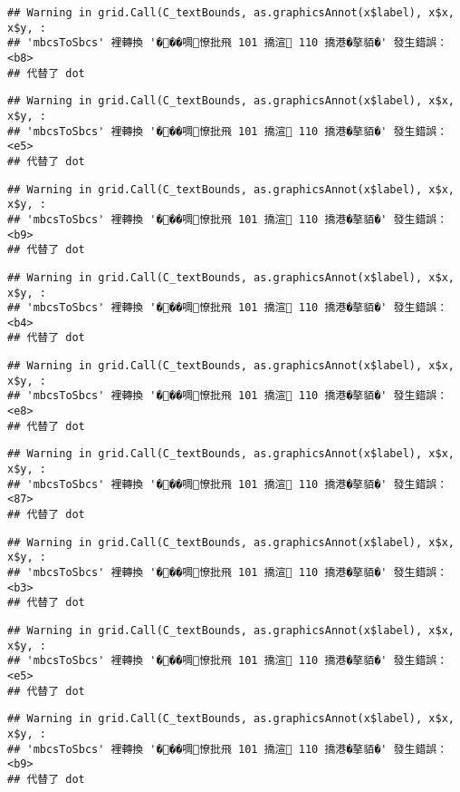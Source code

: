 \documentclass[
]{article}
\begin{document}
\begin{verbatim}
## Warning in grid.Call(C_textBounds, as.graphicsAnnot(x$label), x$x, x$y, :
## 'mbcsToSbcs' 裡轉換 '���啁憭批飛 101 撟渲 110 撟港�摮貊�' 發生錯誤：<b8>
## 代替了 dot
\end{verbatim}

\begin{verbatim}
## Warning in grid.Call(C_textBounds, as.graphicsAnnot(x$label), x$x, x$y, :
## 'mbcsToSbcs' 裡轉換 '���啁憭批飛 101 撟渲 110 撟港�摮貊�' 發生錯誤：<e5>
## 代替了 dot
\end{verbatim}

\begin{verbatim}
## Warning in grid.Call(C_textBounds, as.graphicsAnnot(x$label), x$x, x$y, :
## 'mbcsToSbcs' 裡轉換 '���啁憭批飛 101 撟渲 110 撟港�摮貊�' 發生錯誤：<b9>
## 代替了 dot
\end{verbatim}

\begin{verbatim}
## Warning in grid.Call(C_textBounds, as.graphicsAnnot(x$label), x$x, x$y, :
## 'mbcsToSbcs' 裡轉換 '���啁憭批飛 101 撟渲 110 撟港�摮貊�' 發生錯誤：<b4>
## 代替了 dot
\end{verbatim}

\begin{verbatim}
## Warning in grid.Call(C_textBounds, as.graphicsAnnot(x$label), x$x, x$y, :
## 'mbcsToSbcs' 裡轉換 '���啁憭批飛 101 撟渲 110 撟港�摮貊�' 發生錯誤：<e8>
## 代替了 dot
\end{verbatim}

\begin{verbatim}
## Warning in grid.Call(C_textBounds, as.graphicsAnnot(x$label), x$x, x$y, :
## 'mbcsToSbcs' 裡轉換 '���啁憭批飛 101 撟渲 110 撟港�摮貊�' 發生錯誤：<87>
## 代替了 dot
\end{verbatim}

\begin{verbatim}
## Warning in grid.Call(C_textBounds, as.graphicsAnnot(x$label), x$x, x$y, :
## 'mbcsToSbcs' 裡轉換 '���啁憭批飛 101 撟渲 110 撟港�摮貊�' 發生錯誤：<b3>
## 代替了 dot
\end{verbatim}

\begin{verbatim}
## Warning in grid.Call(C_textBounds, as.graphicsAnnot(x$label), x$x, x$y, :
## 'mbcsToSbcs' 裡轉換 '���啁憭批飛 101 撟渲 110 撟港�摮貊�' 發生錯誤：<e5>
## 代替了 dot
\end{verbatim}

\begin{verbatim}
## Warning in grid.Call(C_textBounds, as.graphicsAnnot(x$label), x$x, x$y, :
## 'mbcsToSbcs' 裡轉換 '���啁憭批飛 101 撟渲 110 撟港�摮貊�' 發生錯誤：<b9>
## 代替了 dot
\end{verbatim}
\end{document}
